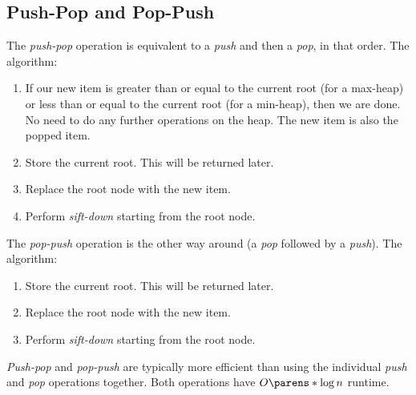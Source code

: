 \subsection{Push-Pop and Pop-Push}

\begin{OpSectionSummary}
    \OpSigSep{}
\end{OpSectionSummary}

The \emph{push-pop} operation is equivalent to a \emph{push} and then a \emph{pop}, in that order. The algorithm:
\begin{enumerate}
    \item If our new item is greater than or equal to the current root (for a max-heap) or less than or equal to the current root (for a min-heap), then we are done. No need to do any further operations on the heap. The new item is also the popped item.
    \item Store the current root. This will be returned later.
    \item Replace the root node with the new item.
    \item Perform \emph{sift-down} starting from the root node.
\end{enumerate}

The \emph{pop-push} operation is the other way around (a \emph{pop} followed by a \emph{push}). The algorithm: %
\begin{enumerate}
    \item Store the current root. This will be returned later.
    \item Replace the root node with the new item.
    \item Perform \emph{sift-down} starting from the root node.
\end{enumerate}

\emph{Push-pop} and \emph{pop-push} are typically more efficient than using the individual \emph{push} and \emph{pop} operations together. Both operations have $O \parens*{\log{n}}$ runtime.

